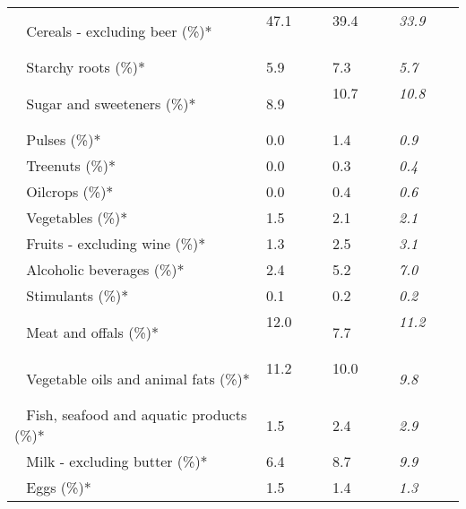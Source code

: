 \begin{tabular}{L{3.9cm} R{1cm} R{1cm} R{1cm}}
	 ~ Cereals - excluding beer (\%)* & 47.1 ~ \ \ & 39.4 ~ \ \ & \textit{33.9} ~ \ \ \\ 
	 ~ Starchy roots (\%)* & 5.9 ~ \ \ & 7.3 ~ \ \ & \textit{5.7} ~ \ \ \\ 
	 ~ Sugar and sweeteners (\%)* & 8.9 ~ \ \ & 10.7 ~ \ \ & \textit{10.8} ~ \ \ \\ 
	 ~ Pulses (\%)* & 0.0 ~ \ \ & 1.4 ~ \ \ & \textit{0.9} ~ \ \ \\ 
	 ~ Treenuts (\%)* & 0.0 ~ \ \ & 0.3 ~ \ \ & \textit{0.4} ~ \ \ \\ 
	 ~ Oilcrops (\%)* & 0.0 ~ \ \ & 0.4 ~ \ \ & \textit{0.6} ~ \ \ \\ 
	 ~ Vegetables (\%)* & 1.5 ~ \ \ & 2.1 ~ \ \ & \textit{2.1} ~ \ \ \\ 
	 ~ Fruits - excluding wine (\%)* & 1.3 ~ \ \ & 2.5 ~ \ \ & \textit{3.1} ~ \ \ \\ 
	 ~ Alcoholic beverages (\%)* & 2.4 ~ \ \ & 5.2 ~ \ \ & \textit{7.0} ~ \ \ \\ 
	 ~ Stimulants (\%)* & 0.1 ~ \ \ & 0.2 ~ \ \ & \textit{0.2} ~ \ \ \\ 
	 ~ Meat and offals (\%)* & 12.0 ~ \ \ & 7.7 ~ \ \ & \textit{11.2} ~ \ \ \\ 
	 ~ Vegetable oils and animal fats (\%)* & 11.2 ~ \ \ & 10.0 ~ \ \ & \textit{9.8} ~ \ \ \\ 
	 ~ Fish, seafood and aquatic products (\%)* & 1.5 ~ \ \ & 2.4 ~ \ \ & \textit{2.9} ~ \ \ \\ 
	 ~ Milk - excluding butter (\%)* & 6.4 ~ \ \ & 8.7 ~ \ \ & \textit{9.9} ~ \ \ \\ 
	 ~ Eggs (\%)* & 1.5 ~ \ \ & 1.4 ~ \ \ & \textit{1.3} ~ \ \ \\ 
       \toprule
      \end{tabular}
      \clearpage
{}
